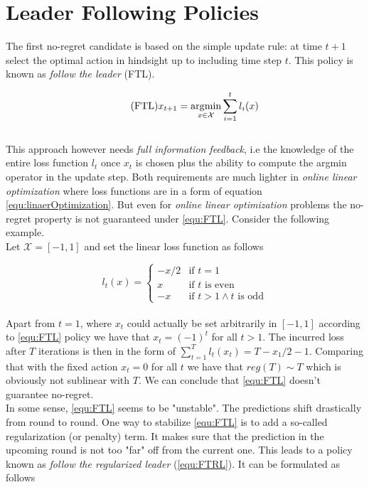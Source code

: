 \section{Leader Following Policies}\label{section:LeaderFollowingPolocies}

The first no-regret candidate is based on the simple update rule: at time $t+1$ select the optimal action in hindsight up to including time step $t$. This policy is known as \textit{follow the leader} (FTL). 

\begin{equation}
    \tag{FTL}
    x_{t+1} = \operatorname*{\arg\!\min}_{x \in \mathcal{X}} \sum_{i=1}^t l_i(x)
    \label{equ:FTL}
\end{equation} \\

This approach however needs \textit{full information feedback}, i.e the knowledge of the entire loss function $l_t$ once $x_t$ is chosen plus the ability to compute the argmin operator in the update step. Both requirements are much lighter in \textit{online linear optimization} where loss functions are in a form of equation \ref{equ:linaerOptimization}. But even for \textit{online linear optimization} problems the no-regret property is not guaranteed under \ref{equ:FTL}. Consider the following example. \\

Let $\mathcal{X} = [-1,1]$ and set the linear loss function as follows

\begin{equation*}
    l_t(x) = \begin{cases}
    -x/2 &\text{if $t = 1$}\\
    x &\text{if $t$ is even}\\
    -x &\text{if $t > 1 \land t$ is odd}
    \end{cases}
\end{equation*} \\

Apart from $t = 1$, where $x_t$ could actually be set arbitrarily in $[-1,1]$ according to \ref{equ:FTL} policy we have that $x_t = (-1)^t$ for all $t > 1$. The incurred loss after $T$ iterations is then in the form of $\sum_{t=1}^T l_t(x_t) = T - x_1/2 -1$. Comparing that with the fixed action $x_t = 0$ for all $t$ we have that $reg(T) \sim T$ which is obviously not sublinear with $T$. We can conclude that \ref{equ:FTL} doesn't guarantee no-regret. \\

In some sense, \ref{equ:FTL} seems to be "unstable". The predictions shift drastically from round to round. One way to stabilize \ref{equ:FTL} is to add a so-called regularization (or penalty) term. It makes sure that the prediction in the upcoming round is not too "far" off from the current one. This leads to a policy known as \textit{follow the regularized leader} (\ref{equ:FTRL}). It can be formulated as follows

